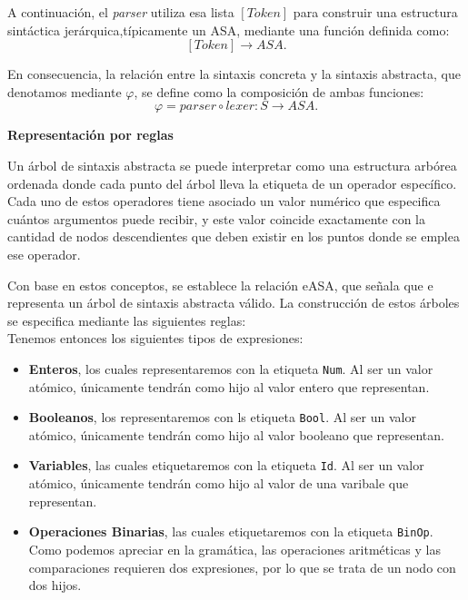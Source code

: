 \documentclass[a4paper,12pt]{article}
\begin{document}
A continuación, el \textit{parser} utiliza esa lista $[Token]$ para construir una estructura sintáctica jerárquica,típicamente un ASA, mediante una función definida como:
\[
[Token] \rightarrow ASA.
\]

En consecuencia, la relación entre la sintaxis concreta y la sintaxis abstracta, que denotamos mediante $\varphi$, se define como la composición de ambas funciones:\cite{LambdaSpace05,Dragon,Aho}
\[
\varphi = parser \circ lexer : S \rightarrow ASA. 
\] 

\begin{tcolorbox}[title=Correción:ASA de  LAMBDAE    MÓDULO A3, breakable]
    \textbf{Representación por reglas}

    
    Un árbol de sintaxis abstracta se puede interpretar como una estructura arbórea ordenada donde cada punto del árbol lleva la etiqueta de un operador específico. Cada uno de estos operadores tiene asociado un valor numérico que especifica cuántos argumentos puede recibir, y este valor coincide exactamente con la cantidad de nodos descendientes que deben existir en los puntos donde se emplea ese operador. 
    
    Con base en estos conceptos, se establece la relación eASA, que señala que e representa un árbol de sintaxis abstracta válido. La construcción de estos árboles se especifica mediante las siguientes reglas:\cite{LambdaSpace05,UNAMTesis,UNAMMaterial}\\
    
    Tenemos entonces los siguientes tipos de expresiones:

\begin{itemize}
    \item \textbf{Enteros}, los cuales representaremos con la etiqueta \texttt{Num}. 
    Al ser un valor atómico, únicamente tendrán como hijo al valor entero que representan.

    \item \textbf{Booleanos}, los representaremos con ls etiqueta \texttt{Bool}.
     Al ser un valor atómico, únicamente tendrán como hijo al valor booleano que representan.

     \item \textbf{Variables}, las cuales etiquetaremos con la etiqueta \texttt{Id}. 
    Al ser un valor atómico, únicamente tendrán como hijo al valor de una varibale que representan.
     
    \item \textbf{Operaciones Binarias}, las cuales etiquetaremos con la etiqueta \texttt{BinOp}. 
    Como podemos apreciar en la gramática, las operaciones aritméticas y las comparaciones requieren dos expresiones, por lo que 
    se trata de un nodo con dos hijos.


\end{itemize}
\end{tcolorbox}
\end{document}
